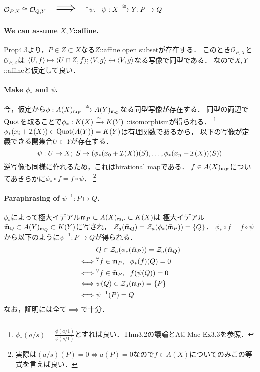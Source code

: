\documentclass[a4paper]{jsarticle}
\newcommand{\bimap}{\xrightarrow{\iso}}
\begin{document}
\section{$\mathcal{O}_{P,X} \cong \mathcal{O}_{Q,Y}$ $\implies$ $\Exists{\psi} \psi:X \bimap Y; P \mapsto Q$} %
    \paragraph{We can assume $X,Y$::affine.}
    Prop4.3より，$P \in Z \subset X$なる$Z$::affine open subsetが存在する．
    このとき$\mathcal{O}_{P,X}$と$\mathcal{O}_{P,Z}$は
    $\langle U,f \rangle \mapsto \langle U \cap Z,f \rangle; \langle V,g \rangle \mapsfrom \langle V,g \rangle$なる写像で同型である．
    なので$X,Y$::affineと仮定して良い．

    \paragraph{Make $\phi_{\ast}$ and $\psi$.}
    今，仮定から$\phi: A(X)_{\mathfrak{m}_P} \xrightarrow{\cong} A(Y)_{\mathfrak{m}_Q}$なる同型写像が存在する．
    同型の両辺で$\operatorname{Quot}$を取ることで$\phi_{\ast}:K(X) \xrightarrow{\cong} K(Y)$ ::isomorphismが得られる．
    \footnote{$\phi_{\ast}(a/s)=\frac{\phi(a/1)}{\phi(s/1)}$とすれば良い．Thm3.2の議論とAti-Mac Ex3.3を参照．}
    $\phi_{\ast}(x_i+\mathcal{I}(X)) \in \operatorname{Quot}(A(Y))=K(Y)$は有理関数であるから，
    以下の写像が定義できる開集合$U \subset Y$が存在する．
    \[ \psi: U \to X;~ S \mapsto (\phi_{\ast}(x_0+\mathcal{I}(X))(S), \dots, \phi_{\ast}(x_n+\mathcal{I}(X))(S)) \]
    逆写像も同様に作れるため，これはbirational mapである．
    $f \in A(X)_{\mathfrak{m}_P}$についてあきらかに$\phi_{\ast} \circ f=f \circ \psi$．
    \footnote{実際は$(a/s)(P)=0 \iff a(P)=0$なので$f \in A(X)$についてのみこの等式を言えば良い．}

    \paragraph{Paraphrasing of $\psi^{-1}: P \mapsto Q$.}
    $\phi_{\ast}$によって極大イデアル$\bar{\mathfrak{m}}_P \subset A(X)_{\mathfrak{m}_P} \subset K(X)$は
    極大イデアル$\bar{\mathfrak{m}}_Q \subset A(Y)_{\bar{\mathfrak{m}}_Q} \subset K(Y)$に写され，
    $\mathcal{Z}_a(\bar{\mathfrak{m}}_Q)=\mathcal{Z}_a(\phi_{\ast}(\bar{\mathfrak{m}}_P))=\{Q\}$．
    $\phi_{\ast} \circ f=f \circ \psi$から以下のように$\psi^{-1}: P \mapsto Q$が得られる．
    \begin{align*}
        {}&     Q \in \mathcal{Z}_a(\phi_{\ast}(\bar{\mathfrak{m}}_P))=\mathcal{Z}_a(\bar{\mathfrak{m}}_Q) \\
        \iff&   {}^{\forall} f \in \bar{\mathfrak{m}}_P,~~ \phi_{\ast}(f)(Q)=0 \\
        \iff&   {}^{\forall} f \in \bar{\mathfrak{m}}_P,~~ f(\psi(Q))=0 \\
        \iff&   \psi(Q) \in \mathcal{Z}_a(\bar{\mathfrak{m}}_P)=\{P\} \\
        \iff&   \psi^{-1}(P)=Q
    \end{align*}
    なお，証明には全て$\implies$で十分．
\end{document}
